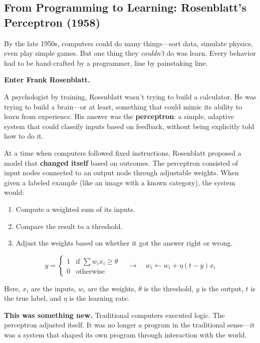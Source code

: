 \subsection{From Programming to Learning: Rosenblatt’s Perceptron (1958)}

By the late 1950s, computers could do many things—sort data, simulate physics, even play simple games. But one thing they \emph{couldn’t} do was learn. Every behavior had to be hand-crafted by a programmer, line by painstaking line.

\medskip

\textbf{Enter Frank Rosenblatt.}

A psychologist by training, Rosenblatt wasn’t trying to build a calculator. He was trying to build a brain—or at least, something that could mimic its ability to learn from experience. His answer was the \textbf{perceptron}: a simple, adaptive system that could classify inputs based on feedback, without being explicitly told how to do it.

\medskip

At a time when computers followed fixed instructions, Rosenblatt proposed a model that \textbf{changed itself} based on outcomes. The perceptron consisted of input nodes connected to an output node through adjustable weights. When given a labeled example (like an image with a known category), the system would:

\begin{enumerate}
  \item Compute a weighted sum of its inputs.
  \item Compare the result to a threshold.
  \item Adjust the weights based on whether it got the answer right or wrong.
\end{enumerate}

\[
y = 
\begin{cases}
1 & \text{if } \sum w_i x_i \geq \theta \\
0 & \text{otherwise}
\end{cases}
\quad \longrightarrow \quad
w_i \gets w_i + \eta (t - y) x_i
\]

Here, \( x_i \) are the inputs, \( w_i \) are the weights, \( \theta \) is the threshold, \( y \) is the output, \( t \) is the true label, and \( \eta \) is the learning rate.

\medskip

\textbf{This was something new.}  
Traditional computers executed logic. The perceptron adjusted itself. It was no longer a program in the traditional sense—it was a system that shaped its own program through interaction with the world.

